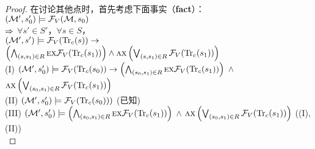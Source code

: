 \begin{proof}
	在讨论其他点时，首先考虑下面事实（\textbf{fact}）：\\
	$({\cal M}',s_0') \models {\cal F}_V({\cal M},s_0)$\\
	$\Rightarrow$ $\forall s'\in S'$，$\forall s\in S$，\\ $({\cal M}', s')\models {\cal F}_V(\textrm{Tr}_c(s)) \rightarrow$  $\left(\bigwedge_{(s,s_1)\in R} \textsc{e} \textsc{x} {\cal F}_V(\textrm{Tr}_c(s_1))\right)\wedge \textsc{a} \textsc{x} \left( \bigvee_{(s,s_1)\in R} {\cal F}_V(\textrm{Tr}_c(s_1))\right)$  \\
	(I) $({\cal M}', s_0') \models {\cal F}_V(\textrm{Tr}_c(s_0)) \rightarrow \left(\bigwedge_{(s_0, s_1) \in R} \textsc{e} \textsc{x} {\cal F}_V(\textrm{Tr}_c(s_1))\right)$ $\wedge$ $\textsc{a} \textsc{x} \left(\bigvee_{(s_0, s_1) \in R} {\cal F}_V(\textrm{Tr}_c(s_1)) \right)$     \\
	(II) $({\cal M}', s_0') \models {\cal F}_V(\textrm{Tr}_c(s_0)))$  \hfill  (已知)\\
	(III) $({\cal M}', s_0') \models \left(\bigwedge_{(s_0, s_1) \in R} \textsc{e} \textsc{x} {\cal F}_V(\textrm{Tr}_c(s_1))\right)$ $\wedge$ $\textsc{a} \textsc{x} \left(\bigvee_{(s_0, s_1) \in R} {\cal F}_V(\textrm{Tr}_c(s_1)) \right)$  \hfill  ((I),(II))\\
	

\end{proof}

